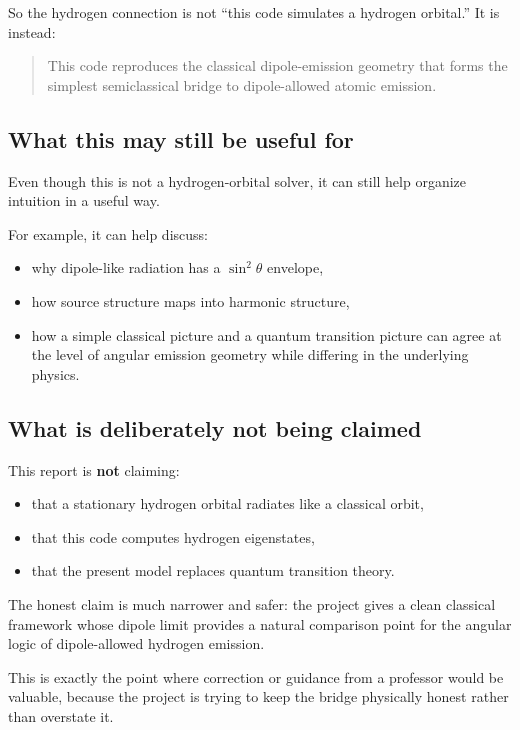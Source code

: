 \documentclass[11pt]{article}
\begin{document}
So the hydrogen connection is not ``this code simulates a hydrogen orbital.''
It is instead:

\begin{quote}
This code reproduces the classical dipole-emission geometry that forms the simplest semiclassical bridge to dipole-allowed atomic emission.
\end{quote}

\subsection*{What this may still be useful for}

Even though this is not a hydrogen-orbital solver, it can still help organize intuition in a useful way.

For example, it can help discuss:
\begin{itemize}
    \item why dipole-like radiation has a $\sin^2\theta$ envelope,
    \item how source structure maps into harmonic structure,
    \item how a simple classical picture and a quantum transition picture can agree at the level of angular emission geometry while differing in the underlying physics.
\end{itemize}

\subsection*{What is deliberately not being claimed}

This report is \textbf{not} claiming:
\begin{itemize}
    \item that a stationary hydrogen orbital radiates like a classical orbit,
    \item that this code computes hydrogen eigenstates,
    \item that the present model replaces quantum transition theory.
\end{itemize}

The honest claim is much narrower and safer: the project gives a clean classical framework whose dipole limit provides a natural comparison point for the angular logic of dipole-allowed hydrogen emission.

This is exactly the point where correction or guidance from a professor would be valuable, because the project is trying to keep the bridge physically honest rather than overstate it.
\end{document}
